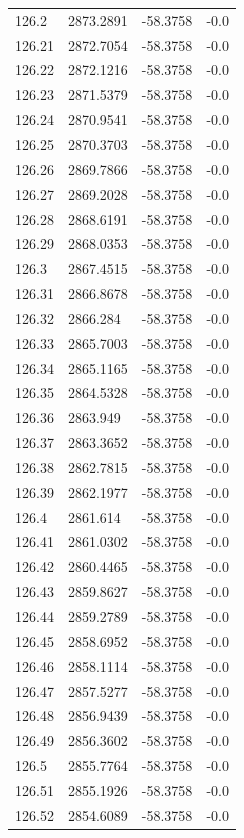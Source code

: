 \begin{table}[H]
\begin{tabular}{llll}
126.2 & 2873.2891 & -58.3758 & -0.0 \\
126.21 & 2872.7054 & -58.3758 & -0.0 \\
126.22 & 2872.1216 & -58.3758 & -0.0 \\
126.23 & 2871.5379 & -58.3758 & -0.0 \\
126.24 & 2870.9541 & -58.3758 & -0.0 \\
126.25 & 2870.3703 & -58.3758 & -0.0 \\
126.26 & 2869.7866 & -58.3758 & -0.0 \\
126.27 & 2869.2028 & -58.3758 & -0.0 \\
126.28 & 2868.6191 & -58.3758 & -0.0 \\
126.29 & 2868.0353 & -58.3758 & -0.0 \\
126.3 & 2867.4515 & -58.3758 & -0.0 \\
126.31 & 2866.8678 & -58.3758 & -0.0 \\
126.32 & 2866.284 & -58.3758 & -0.0 \\
126.33 & 2865.7003 & -58.3758 & -0.0 \\
126.34 & 2865.1165 & -58.3758 & -0.0 \\
126.35 & 2864.5328 & -58.3758 & -0.0 \\
126.36 & 2863.949 & -58.3758 & -0.0 \\
126.37 & 2863.3652 & -58.3758 & -0.0 \\
126.38 & 2862.7815 & -58.3758 & -0.0 \\
126.39 & 2862.1977 & -58.3758 & -0.0 \\
126.4 & 2861.614 & -58.3758 & -0.0 \\
126.41 & 2861.0302 & -58.3758 & -0.0 \\
126.42 & 2860.4465 & -58.3758 & -0.0 \\
126.43 & 2859.8627 & -58.3758 & -0.0 \\
126.44 & 2859.2789 & -58.3758 & -0.0 \\
126.45 & 2858.6952 & -58.3758 & -0.0 \\
126.46 & 2858.1114 & -58.3758 & -0.0 \\
126.47 & 2857.5277 & -58.3758 & -0.0 \\
126.48 & 2856.9439 & -58.3758 & -0.0 \\
126.49 & 2856.3602 & -58.3758 & -0.0 \\
126.5 & 2855.7764 & -58.3758 & -0.0 \\
126.51 & 2855.1926 & -58.3758 & -0.0 \\
126.52 & 2854.6089 & -58.3758 & -0.0 \\

\end{tabular}
\end{table}
